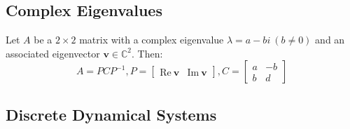 \documentclass[11pt]{scrartcl}
\theoremstyle{dotlessP}
\theoremstyle{dotlessN}
\newcommand{\complex}{\mathbb{C}}
\newcommand{\re}{\text{Re}}
\newcommand{\im}{\text{Im}}
\begin{document}
\subsection{Complex Eigenvalues}
\begin{theorem}
	Let $A$ be a $2 \times 2$ matrix with a complex eigenvalue $\lambda = a - bi \ (b \neq 0)$ and an associated eigenvector $\bm{v} \in \complex^2$. Then:
	\[
		A = PCP^{-1}, P = 
		\begin{bmatrix}
		\re\  \bm{v} & \im\ \bm{v}
		\end{bmatrix}, C = 
		\begin{bmatrix}
			a & -b \\
			b & d
		\end{bmatrix}
	\] 
\end{theorem}
\subsection{Discrete Dynamical Systems}
\end{document}
